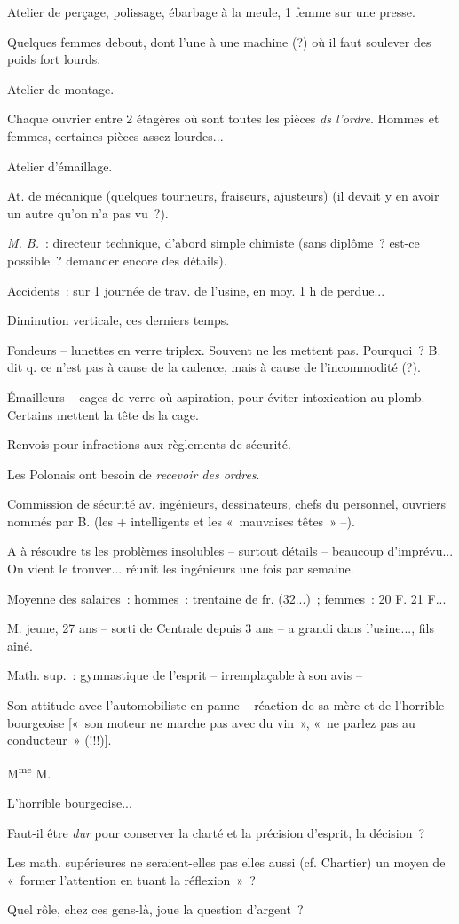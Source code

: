 \documentclass[french,twoside]{book} %
\begin{document}
Atelier de perçage, polissage, ébarbage à la meule, 1 femme sur une presse.\par
Quelques femmes debout, dont l'une à une machine (?) où il faut soulever des poids fort lourds.\par
Atelier de montage.\par
Chaque ouvrier entre 2 étagères où sont toutes les pièces {\itshape ds l'ordre}. Hommes et femmes, certaines pièces assez lourdes...\par
Atelier d'émaillage.\par
At. de mécanique (quelques tourneurs, fraiseurs, ajusteurs) (il devait y en avoir un autre qu'on n'a pas vu ?).\par
{\itshape M. B.} : directeur technique, d'abord simple chimiste (sans diplôme ? est-ce possible ? demander encore des détails).\par
Accidents : sur 1 journée de trav. de l'usine, en moy. 1 h de perdue...\par
Diminution verticale, ces derniers temps.\par
Fondeurs – lunettes en verre triplex. Souvent ne les mettent pas. Pourquoi ? B. dit q. ce n'est pas à cause de la cadence, mais à cause de l'incommodité (?).\par
Émailleurs – cages de verre où aspiration, pour éviter intoxication au plomb. Certains mettent la tête ds la cage.\par
Renvois pour infractions aux règlements de sécurité.\par
Les Polonais ont besoin de {\itshape recevoir des ordres}.\par
Commission de sécurité av. ingénieurs, dessinateurs, chefs du personnel, ouvriers nommés par B. (les + intelligents et les « mauvaises têtes » –).\par
A à résoudre ts les problèmes insolubles – surtout détails – beaucoup d'imprévu... On vient le trouver... réunit les ingénieurs une fois par semaine.\par
Moyenne des salaires : hommes : trentaine de fr. (32...) ; femmes : 20 F. 21 F...\par
M. jeune, 27 ans – sorti de Centrale depuis 3 ans – a grandi dans l'usine..., fils aîné.\par
Math. sup. : gymnastique de l'esprit – irremplaçable à son avis –\par
Son attitude avec l'automobiliste en panne – réaction de sa mère et de l'horrible bourgeoise [« son moteur ne marche pas avec du vin », « ne parlez pas au conducteur » (!!!)].\par
M\textsuperscript{me} M.\par
L'horrible bourgeoise...\par
Faut-il être {\itshape dur} pour conserver la clarté et la précision d'esprit, la décision ?\par
Les math. supérieures ne seraient-elles pas elles aussi (cf. Chartier) un moyen de « former l'attention en tuant la réflexion » ?\par
Quel rôle, chez ces gens-là, joue la question d'argent ?\par
\end{document}
